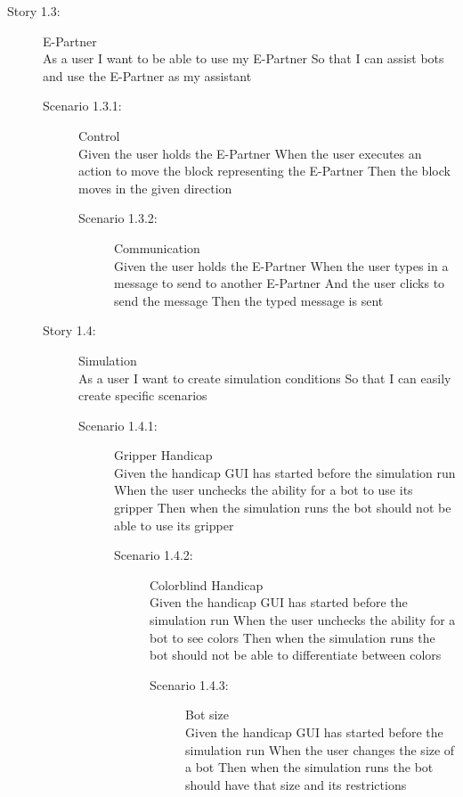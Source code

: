 \begin{description}
\item[Story 1.3:] E-Partner\\
As a user
I want to be able to use my E-Partner
So that I can assist bots and use the E-Partner as my assistant

\begin{description}
\item[Scenario 1.3.1:] Control\\
Given the user holds the E-Partner
When the user executes an action to move the block representing the E-Partner
Then the block moves in the given direction

\begin{description}
\item[Scenario 1.3.2:] Communication\\
Given the user holds the E-Partner
When the user types in a message to send to another E-Partner
And the user clicks to send the message
Then the typed message is sent

\end{description}
\end{description}

\begin{description}
\item[Story 1.4:] Simulation\\
As a user
I want to create simulation conditions
So that I can easily create specific scenarios
\begin{description}
\item[Scenario 1.4.1:] Gripper Handicap\\
Given the handicap GUI has started before the simulation run
When the user unchecks the ability for a bot to use its gripper
Then when the simulation runs the bot should not be able to use its gripper

\begin{description}
\item[Scenario 1.4.2:] Colorblind Handicap\\
Given the handicap GUI has started before the simulation run
When the user unchecks the ability for a bot to see colors
Then when the simulation runs the bot should not be able to differentiate between colors

\begin{description}
\item[Scenario 1.4.3:] Bot size\\
Given the handicap GUI has started before the simulation run
When the user changes the size of a bot
Then when the simulation runs the bot should have that size and its restrictions


\end{description}
\end{description}
\end{description}
\end{description}
\end{description}
